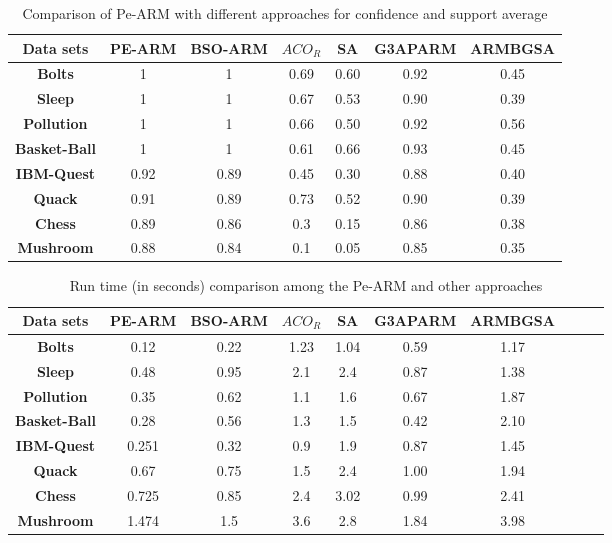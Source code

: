 \documentclass[preprint,12pt]{elsarticle}
\begin{document}
\begin{table}[htbp]
\small
\centering
\label{Fig3}
\caption{Comparison of Pe-ARM with different approaches for confidence and support average }
\begin{tabular}{c c c c c c c}
\toprule
\textbf{Data sets} &  PE-ARM& BSO-ARM & $ACO_{R}$ & SA & G3APARM & ARMBGSA\\
\midrule
\textbf{Bolts}&		1&		1& 0.69 & 0.60 & 0.92 & 0.45\\\hline
\textbf{Sleep}&		1&		1& 0.67 & 0.53 & 0.90 & 0.39\\\hline
\textbf{Pollution}&		1&		1 & 0.66 & 0.50 & 0.92 & 0.56\\\hline
\textbf{Basket-Ball}&	 1&		1 & 0.61 & 0.66 & 0.93 & 0.45\\\hline
\textbf{IBM-Quest}&	 0.92&	0.89 &  0.45 & 0.30 & 0.88 & 0.40\\\hline
\textbf{Quack}&		0.91&		0.89& 0.73 & 0.52 & 0.90 & 0.39\\\hline
\textbf{Chess}&		0.89&		0.86 & 0.3 & 0.15 & 0.86 & 0.38\\\hline
\textbf{Mushroom}&	0.88 &	0.84 & 0.1 & 0.05 & 0.85 &0.35\\\hline
\bottomrule
\end{tabular}
\end{table}
\begin{table}[htbp]
\small
\centering
\label{Fig4}
\caption{ Run time (in seconds) comparison among the Pe-ARM and other approaches}
\begin{tabular}{c c c c c c c c c c}
\toprule
\textbf{Data sets} & PE-ARM& BSO-ARM & $ACO_{R}$ & SA & G3APARM & ARMBGSA \\
\midrule
\textbf{Bolts}&			0.12&		0.22& 1.23 & 1.04 & 0.59 & 1.17 &\\\hline
\textbf{Sleep}&		0.48&		0.95& 2.1 & 2.4 & 0.87 & 1.38 &\\\hline
\textbf{Pollution}&		0.35&		0.62& 1.1 & 1.6 & 0.67 & 1.87 &\\\hline
\textbf{Basket-Ball}&		0.28&		0.56&  1.3 & 1.5 & 0.42 & 2.10 &\\\hline
\textbf{IBM-Quest}&		0.251&	0.32& 0.9 & 1.9 & 0.87 & 1.45 &\\\hline
\textbf{Quack}&		0.67&		0.75&  1.5 & 2.4 & 1.00 & 1.94 &\\\hline
\textbf{Chess}&		0.725&		0.85& 2.4 &  3.02 & 0.99& 2.41 &\\\hline
\textbf{Mushroom}&		1.474&	1.5& 3.6 & 2.8 & 1.84 & 3.98 &\\\hline
\bottomrule
\end{tabular}
\end{table}
\end{document}

